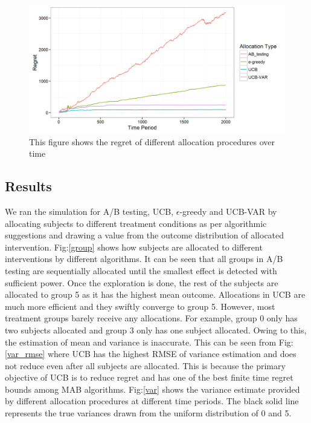 \documentclass[12pt, letterpaper]{article}
\begin{document}
\begin{figure}
  \centering
    \includegraphics[width=\textwidth]{figs/regret.png}
      \caption{This figure shows the regret of different allocation procedures over time}
      \label{regret}
\end{figure}


\subsection*{Results}

We ran the simulation for A/B testing, UCB, $\epsilon$-greedy and UCB-VAR by allocating subjects to different treatment conditions as per algorithmic suggestions and drawing a value from the outcome distribution of allocated intervention. Fig:\ref{group} shows how subjects are allocated to different interventions by different algorithms. It can be seen that all groups in A/B testing are sequentially allocated until the smallest effect is detected with sufficient power. Once the exploration is done, the rest of the subjects are allocated to group 5 as it has the highest mean outcome. Allocations in UCB are much more efficient and they swiftly converge to group 5. However, most treatment groups barely receive any allocations. For example, group 0 only has two subjects allocated and group 3 only has one subject allocated.  Owing to this, the estimation of mean and variance is inaccurate. This can be seen from Fig:\ref{var_rmse} where UCB has the highest RMSE of variance estimation and does not reduce even after all subjects are allocated. This is because the primary objective of UCB is to reduce regret and has one of the best finite time regret bounds among MAB algorithms. Fig:\ref{var} shows the variance estimate provided by different allocation procedures at different time periods. The black solid line represents the true variances drawn from the uniform distribution of 0 and 5. 
\end{document}
